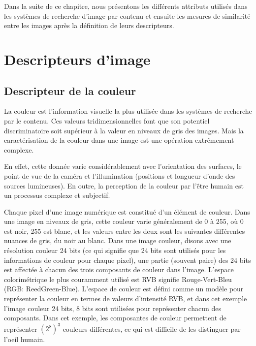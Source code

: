 Dans la suite de ce chapitre, nous présentons les différents attributs utilisés dans les systèmes de recherche d’image par contenu et ensuite les mesures de similarité entre les images après la définition de leurs descripteurs.





\section{Descripteurs d’image}

\subsection{Descripteur de la couleur}
La couleur est l’information visuelle la plus utilisée dans les systèmes de recherche par le contenu. Ces valeurs tridimensionnelles font que son potentiel discriminatoire soit supérieur à la valeur en niveaux de gris des images. Mais la caractérisation de la couleur dans une image est une opération extrêmement complexe.

En effet, cette donnée varie considérablement avec l’orientation des surfaces, le point de vue de la caméra et l’illumination (positions et longueur d’onde des sources lumineuses). En outre, la perception de la couleur par l'être humain est un processus complexe et subjectif.

Chaque pixel d'une image numérique est constitué d'un élément de couleur. Dans une image en niveaux de gris, cette couleur varie généralement de 0 à 255, où 0 est noir, 255 est blanc, et les valeurs entre les deux sont les suivantes différentes nuances de gris, du noir au blanc. Dans une image couleur, disons avec une résolution couleur 24 bits (ce qui signifie que 24 bits sont utilisés pour les informations de couleur pour chaque pixel), une partie (souvent paire) des 24 bits est affectée à chacun des trois composants de couleur dans l’image. L'espace colorimétrique le plus couramment utilisé est RVB signifie Rouge-Vert-Bleu (RGB: ReedGreen-Blue). L'espace de couleur est défini comme un modèle pour représenter la couleur en termes de valeurs d'intensité RVB, et dans cet exemple l'image couleur 24 bits, 8 bits sont utilisées pour représenter chacun des composants. Dans cet exemple, les composantes de couleur permettent de représenter $(2 ^ 8) ^ 3$ couleurs différentes, ce qui est difficile de les
distinguer par l'oeil humain.

